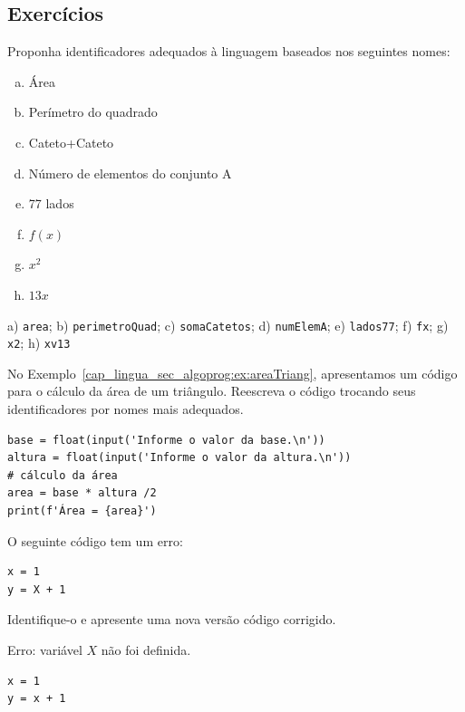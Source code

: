 \subsection{Exercícios}

\begin{exer}
  Proponha identificadores adequados à linguagem {\python} baseados nos seguintes nomes:
  \begin{enumerate}[a)]
  \item Área
  \item Perímetro do quadrado
  \item Cateto+Cateto
  \item Número de elementos do conjunto A
  \item 77 lados
  \item $f(x)$
  \item $x^2$
  \item $13x$
  \end{enumerate}
\end{exer}
\begin{resp}
  a) \lstinline+area+; b) \lstinline+perimetroQuad+; c) \lstinline+somaCatetos+; d) \lstinline+numElemA+; e) \lstinline+lados77+; f) \lstinline+fx+; g) \lstinline+x2+; h) \lstinline+xv13+
\end{resp}

\begin{exer}
  No Exemplo~\ref{cap_lingua_sec_algoprog:ex:areaTriang}, apresentamos um código {\python} para o cálculo da área de um triângulo. Reescreva o código trocando seus identificadores por nomes mais adequados.
\end{exer}
\begin{resp}

\begin{lstlisting}
base = float(input('Informe o valor da base.\n'))
altura = float(input('Informe o valor da altura.\n'))
# cálculo da área
area = base * altura /2
print(f'Área = {area}')
\end{lstlisting}

\end{resp}

\begin{exer}
  O seguinte código {\python} tem um erro:

\begin{lstlisting}
x = 1
y = X + 1
\end{lstlisting}

  Identifique-o e apresente uma nova versão código corrigido.
\end{exer}
\begin{resp}
  Erro: variável $X$ não foi definida.

\begin{lstlisting}
x = 1
y = x + 1
\end{lstlisting}

\end{resp}

